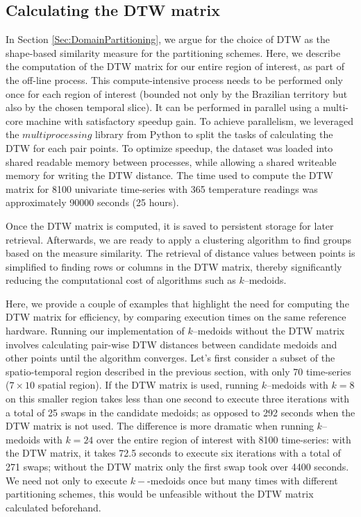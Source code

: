 \subsection{Calculating the DTW matrix}
In Section \ref{Sec:DomainPartitioning}, we argue for the choice of DTW as the shape-based similarity measure for the partitioning schemes. Here, we describe the computation of the DTW matrix for our entire region of interest, as part of the off-line process. This compute-intensive process needs to be performed only once for each region of interest (bounded not only by the Brazilian territory but also by the chosen temporal slice). It can be performed in parallel using a multi-core machine with satisfactory speedup gain. To achieve parallelism, we leveraged the $multiprocessing$ library from Python to split the tasks of calculating the DTW for each pair points. To optimize speedup, the dataset was loaded into shared readable memory between processes, while allowing a shared writeable memory for writing the DTW distance. The time used to compute the DTW matrix for 8100 univariate time-series with 365 temperature readings was approximately 90000 seconds (25 hours).

Once the DTW matrix is computed, it is saved to persistent storage for later retrieval. Afterwards, we are ready to apply a clustering algorithm to find groups based on the measure similarity. 
The retrieval of distance values between points is simplified to finding rows or columns in the DTW matrix, thereby significantly reducing the computational cost of algorithms such as $k$--medoids.

Here, we provide a couple of examples that highlight the need for computing the DTW matrix for efficiency, by comparing execution times on the same reference hardware. Running our implementation of $k$--medoids without the DTW matrix involves calculating pair-wise DTW distances between candidate medoids and other points until the algorithm converges. Let's first consider a subset of the spatio-temporal region described in the previous section, with only 70 time-series ($7 \times 10$ spatial region). If the DTW matrix is used, running $k$--medoids with $k=8$ on this smaller region takes less than one second to execute three iterations with a total of 25 swaps in the candidate medoids; as opposed to 292 seconds when the DTW matrix is not used. The difference is more dramatic when running $k$--medoids with $k=24$ over the entire region of interest with 8100 time-series: with the DTW matrix, it  takes 72.5 seconds to execute six iterations with a total of 271 swaps; without the DTW matrix only the first swap took over 4400 seconds. We need not only to execute $k-$-medoids once but many times with different partitioning schemes, this would be unfeasible without the DTW matrix calculated beforehand.

